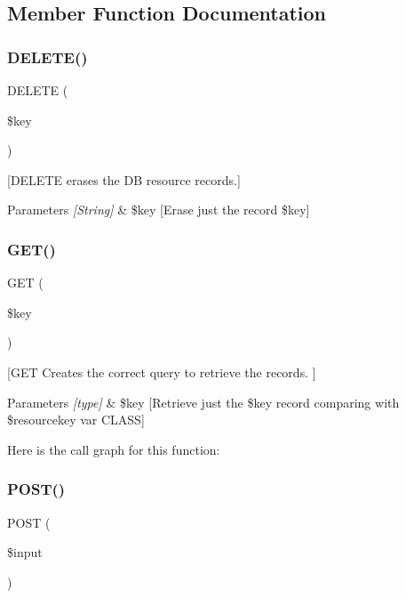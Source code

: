 \subsection{Member Function Documentation}
\mbox{\label{class_outcomes_a10abe19fb01e7c9a2b88104cf8afc666}} 
\subsubsection{\texorpdfstring{D\+E\+L\+E\+T\+E()}{DELETE()}}
{\footnotesize\ttfamily D\+E\+L\+E\+TE (\begin{DoxyParamCaption}\item[{}]{\$key }\end{DoxyParamCaption})}

\mbox{[}D\+E\+L\+E\+TE erases the DB resource records.\mbox{]} 
\begin{DoxyParams}{Parameters}
{\em \mbox{[}\+String\mbox{]}} & \$key \mbox{[}Erase just the record \$key\mbox{]} \\
\hline
\end{DoxyParams}
\mbox{\label{class_outcomes_a7490aac9922424f1e605adf9cda9a78b}} 
\subsubsection{\texorpdfstring{G\+E\+T()}{GET()}}
{\footnotesize\ttfamily G\+ET (\begin{DoxyParamCaption}\item[{}]{\$key }\end{DoxyParamCaption})}

\mbox{[}G\+ET Creates the correct query to retrieve the records. \mbox{]} 
\begin{DoxyParams}{Parameters}
{\em \mbox{[}type\mbox{]}} & \$key \mbox{[}Retrieve just the \$key record comparing with \$resourcekey var C\+L\+A\+SS\mbox{]} \\
\hline
\end{DoxyParams}
Here is the call graph for this function\+:
\mbox{\label{class_outcomes_aea3bf4cb6556d5b12c15f871fc0960f6}} 
\subsubsection{\texorpdfstring{P\+O\+S\+T()}{POST()}}
{\footnotesize\ttfamily P\+O\+ST (\begin{DoxyParamCaption}\item[{}]{\$input }\end{DoxyParamCaption})}

